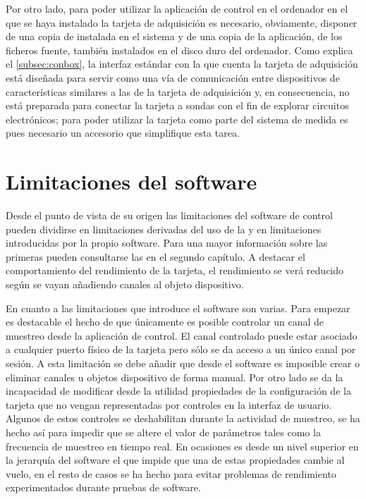 Por otro lado, para poder utilizar la aplicación de control en el ordenador
en el que se haya instalado la tarjeta de adquisición es necesario,
obviamente, disponer de una copia de  instalada en el sistema y
de una copia de la aplicación, de los ficheros fuente, también instalados
en el disco duro del ordenador. Como explica el \cref{subsec:conbox}, la
interfaz estándar con la que cuenta la tarjeta de adquisición está diseñada
para servir como una vía de comunicación entre dispositivos de
características similares a las de la tarjeta de adquisición y, en
consecuencia, no está preparada para conectar la tarjeta a sondas con el
fin de explorar circuitos electrónicos; para poder utilizar la tarjeta como
parte del sistema de medida es pues necesario un accesorio que simplifique
esta tarea.


\section{Limitaciones del software}

Desde el punto de vista de su origen las limitaciones del software de
control pueden dividirse en limitaciones derivadas del uso de la \kpci{} y
en limitaciones introducidas por la propio software. Para una mayor
información sobre las primeras pueden consultarse las
 en el segundo capítulo. A
destacar el comportamiento del rendimiento de la tarjeta, el rendimiento se
verá reducido según se vayan añadiendo canales al objeto dispositivo.

En cuanto a las limitaciones que introduce el software son varias. Para
empezar es destacable el hecho de que únicamente es posible controlar un
canal de muestreo desde la aplicación de control. El canal controlado puede
estar asociado a cualquier puerto físico de la tarjeta pero sólo se da
acceso a un único canal por sesión. A esta limitación se debe añadir que
desde el software es imposible crear o eliminar canales u objetos
dispositivo de forma manual. Por otro lado se da la incapacidad de
modificar desde la utilidad propiedades de la configuración de la tarjeta
que no vengan representadas por controles en la interfaz de usuario.
Algunos de estos controles se deshabilitan durante la actividad de
muestreo, se ha hecho así para impedir que se altere el valor de parámetros
tales como la frecuencia de muestreo en tiempo real. En ocasiones es
\matlab{} desde un nivel superior en la jerarquía del software el que
impide que una de estas propiedades cambie al vuelo, en el resto de casos
se ha hecho para evitar problemas de rendimiento experimentados durante
pruebas de software.


